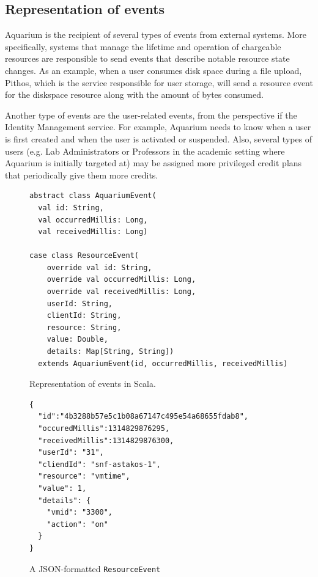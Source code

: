 \documentclass[preprint,10pt]{sigplanconf}
\begin{document}
\subsection{Representation of events}
Aquarium is the recipient of several types of events from external systems. More specifically, systems that manage the lifetime and operation of chargeable resources are responsible to send events that describe notable resource state changes. As an example, when a user consumes disk space during a file upload, Pithos, which is the service responsible for user storage, will send a resource event for the \textsf{diskspace} resource along with the amount of bytes consumed.

Another type of events are the user-related events, from the perspective if the Identity Management service. For example, Aquarium needs to know when a user is first created and when the user is activated or suspended. Also, several types of users (e.g. Lab Administrators or Professors in the academic setting where Aquarium is initially targeted at) may be assigned more privileged credit plans that periodically give them more credits.

\begin{figure}
\lstset{language=c, basicstyle=\footnotesize,
stringstyle=\ttfamily, 
flexiblecolumns=true, aboveskip=-0.9em, belowskip=0em, lineskip=0em}

\begin{lstlisting}
abstract class AquariumEvent(
  val id: String,
  val occurredMillis: Long,
  val receivedMillis: Long)
  
case class ResourceEvent(
    override val id: String,
    override val occurredMillis: Long, 
    override val receivedMillis: Long, 
    userId: String,
    clientId: String,               
    resource: String,
    value: Double,
    details: Map[String, String])
  extends AquariumEvent(id, occurredMillis, receivedMillis)
\end{lstlisting}
\caption{Representation of events in Scala.}
\label{fig:aqevent}
\end{figure}

\begin{figure}
\lstset{language=C, basicstyle=\footnotesize,
stringstyle=\ttfamily, 
flexiblecolumns=true, aboveskip=-0.9em, belowskip=0em, lineskip=0em}

\begin{lstlisting}
{
  "id":"4b3288b57e5c1b08a67147c495e54a68655fdab8",
  "occuredMillis":1314829876295,
  "receivedMillis":1314829876300,
  "userId": "31",
  "cliendId": "snf-astakos-1",
  "resource": "vmtime",
  "value": 1,
  "details": {
    "vmid": "3300",
    "action": "on"
  }
}
\end{lstlisting}
\caption{A JSON-formatted \texttt{ResourceEvent}} 
\label{fig:resevt}
\end{figure}
\end{document}
